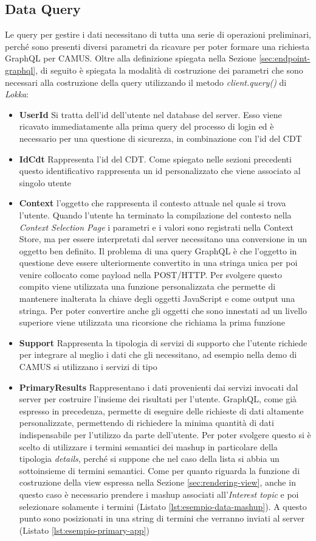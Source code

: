 \subsection{Data Query} \label{sec:data-query}
Le query per gestire i dati necessitano di tutta una serie di operazioni preliminari, perché sono presenti diversi parametri da ricavare per poter formare una richiesta GraphQL per CAMUS. Oltre alla definizione spiegata nella Sezione \ref{sec:endpoint-graphql}, di seguito è spiegata la modalità di costruzione dei parametri che sono necessari alla costruzione della query utilizzando il metodo \emph{client.query()} di \emph{Lokka}:
\begin{itemize}
	\item \textbf{UserId} Si tratta dell'id dell'utente nel database del server. Esso viene ricavato immediatamente alla prima query del processo di login ed è necessario per una questione di sicurezza, in combinazione con l'id del CDT
	\item \textbf{IdCdt} Rappresenta l'id del CDT. Come spiegato nelle sezioni precedenti questo identificativo rappresenta un id personalizzato che viene associato al singolo utente
	\item \textbf{Context} \upe l'oggetto che rappresenta il contesto attuale nel quale si trova l'utente. Quando l'utente ha terminato la compilazione del contesto nella \emph{Context Selection Page} i parametri e i valori sono registrati nella Context Store, ma per essere interpretati dal server necessitano una conversione in un oggetto ben definito. Il problema di una query GraphQL è che l'oggetto in questione deve essere ulteriormente convertito in una stringa unica per poi venire collocato come payload nella POST/HTTP. Per svolgere questo compito viene utilizzata una funzione personalizzata che permette di mantenere inalterata la chiave degli oggetti JavaScript e come output una stringa. Per poter convertire anche gli oggetti che sono innestati ad un livello superiore viene utilizzata una ricorsione che richiama la prima funzione
	\item \textbf{Support} Rappresenta la tipologia di servizi di supporto che l'utente richiede per integrare al meglio i dati che gli necessitano, ad esempio nella demo di CAMUS si utilizzano i servizi di tipo 
	\item \textbf{PrimaryResults} Rappresentano i dati provenienti dai servizi invocati dal server per costruire l'insieme dei risultati per l'utente. GraphQL, come già espresso in precedenza, permette di eseguire delle richieste di dati altamente personalizzate, permettendo di richiedere la minima quantità di dati indispensabile per l'utilizzo da parte dell'utente. Per poter svolgere questo si è scelto di utilizzare i termini semantici dei mashup in particolare della tipologia \emph{details}, perché si suppone che nel caso della lista si abbia un sottoinsieme di termini semantici. Come per quanto riguarda la funzione di costruzione della view espressa nella Sezione \ref{sec:rendering-view}, anche in questo caso è necessario prendere i mashup associati all'\emph{Interest topic} e poi selezionare solamente i termini (Listato \ref{lst:esempio-data-mashup}). A questo punto sono posizionati in una string di termini che verranno inviati al server (Listato \ref{lst:esempio-primary-app})

\end{itemize}
